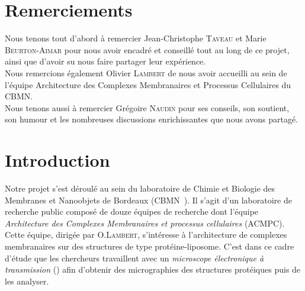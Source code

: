 \documentclass[12pt,a4paper]{report}
\begin{document}
\begin{abstract}
\end{abstract}

\thispagestyle{empty}

\chapter*{Remerciements}

\thispagestyle{empty}

Nous tenons tout d'abord à remercier Jean-Christophe \textsc{Taveau} et Marie \textsc{Beurton-Aimar} pour nous avoir encadré et conseillé tout au long de ce projet, ainsi que d'avoir su nous faire partager leur expérience. \\

Nous remercions également Olivier \textsc{Lambert} de nous avoir accueilli au sein de l'équipe Architecture des Complexes Membranaires et Processus Cellulaires du CBMN. \\

Nous tenons aussi à remercier Grégoire \textsc{Naudin} pour ses conseils, son soutient, son humour et les nombreuses discussions enrichissantes que nous avons partagé.  

\thispagestyle{empty}

\tableofcontents

\thispagestyle{empty}


\chapter*{Introduction}

\setcounter{page}{5}

Notre projet s'est déroulé au sein du laboratoire de Chimie et Biologie des Membranes et Nanoobjets de Bordeaux (CBMN~\cite{cbmn:url}).
Il s'agit d'un laboratoire de recherche public composé de douze équipes de recherche dont l'équipe \emph{Architecture des Complexes Membranaires et processus cellulaires} (ACMPC). %
Cette équipe, dirigée par O.\textsc{Lambert}, s'intéresse à l'architecture de complexes membranaires sur des structures de type protéine-liposome. C'est dans ce cadre d'étude que les chercheurs travaillent avec un \emph{microscope électronique à transmission} (\me) afin d'obtenir des micrographies des structures protéiques puis de les analyser. \\
\end{document}
